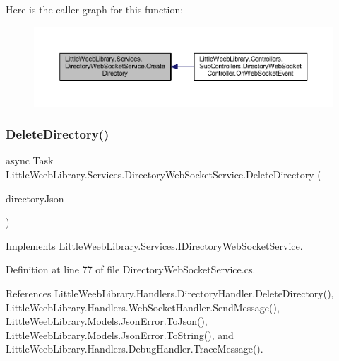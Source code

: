 Here is the caller graph for this function\+:\nopagebreak
\begin{figure}[H]
\begin{center}
\leavevmode
\includegraphics[width=350pt]{class_little_weeb_library_1_1_services_1_1_directory_web_socket_service_a3ea6566e0d21d73d331adce1ae9c7f07_icgraph}
\end{center}
\end{figure}
\mbox{\label{class_little_weeb_library_1_1_services_1_1_directory_web_socket_service_ac0af5740848de2340e4d3e9225eeb0d7}} 
\subsubsection{\texorpdfstring{Delete\+Directory()}{DeleteDirectory()}}
{\footnotesize\ttfamily async Task Little\+Weeb\+Library.\+Services.\+Directory\+Web\+Socket\+Service.\+Delete\+Directory (\begin{DoxyParamCaption}\item[{J\+Object}]{directory\+Json }\end{DoxyParamCaption})}



Implements \mbox{\hyperlink{interface_little_weeb_library_1_1_services_1_1_i_directory_web_socket_service_a7247bbfce026cc39dc8721536c8ba6a8}{Little\+Weeb\+Library.\+Services.\+I\+Directory\+Web\+Socket\+Service}}.



Definition at line 77 of file Directory\+Web\+Socket\+Service.\+cs.



References Little\+Weeb\+Library.\+Handlers.\+Directory\+Handler.\+Delete\+Directory(), Little\+Weeb\+Library.\+Handlers.\+Web\+Socket\+Handler.\+Send\+Message(), Little\+Weeb\+Library.\+Models.\+Json\+Error.\+To\+Json(), Little\+Weeb\+Library.\+Models.\+Json\+Error.\+To\+String(), and Little\+Weeb\+Library.\+Handlers.\+Debug\+Handler.\+Trace\+Message().



